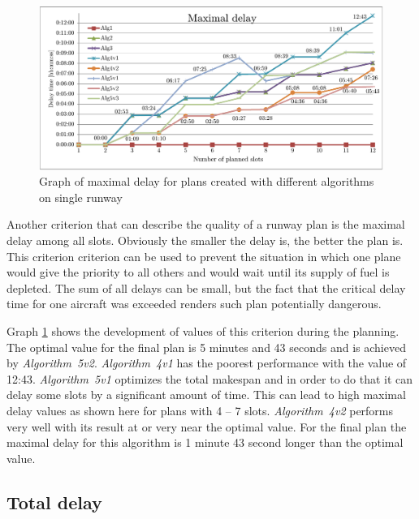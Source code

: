 \begin{figure}[h]
    \centering
    \includegraphics[width=\textwidth]{graphs/1rwy-alternating-maximal-delay.pdf}
    \caption{Graph of maximal delay for plans created with different algorithms on single runway}
    \label{graph:1rwy-alternating-maximal-delay}
\end{figure}

Another criterion that can describe the quality of a runway plan is the maximal delay among all slots. Obviously the smaller the delay is, the better the plan is. This criterion criterion can be used to prevent the situation in which one plane would give the priority to all others and would wait until its supply of fuel is depleted. The sum of all delays can be small, but the fact that the critical delay time for one aircraft was exceeded renders such plan potentially dangerous.

Graph \ref{graph:1rwy-alternating-maximal-delay} shows the development of values of this criterion during the planning. The optimal value for the final plan is 5 minutes and 43 seconds and is achieved by {\em Algorithm~5v2}. {\em Algorithm~4v1} has the poorest performance with the value of 12:43. {\em Algorithm~5v1} optimizes the total makespan and in order to do that it can delay some slots by a significant amount of time. This can lead to high maximal delay values as shown here for plans with 4 – 7 slots. {\em Algorithm~4v2} performs very well with its result at or very near the optimal value. For the final plan the maximal delay for this algorithm is 1 minute 43 second longer than the optimal value.

\subsection{Total delay}


